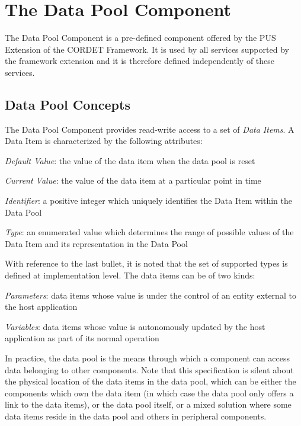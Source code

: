\documentclass[a4paper,10pt]{article}
\let\stdsection\section
\renewcommand\section{\newpage\stdsection}
\newenvironment{fw_itemize}						%
{\begin{itemize}
  \setlength{\itemsep}{1mm}
  \setlength{\parskip}{0pt}
  \setlength{\parsep}{0pt}}
{\end{itemize}}
\begin{document}
\section{The Data Pool Component}\label{sec:dp}
The Data Pool Component is a pre-defined component offered by the PUS Extension of the CORDET Framework. It is used by all services supported by the framework extension and it is therefore defined independently of these services.

\subsection{Data Pool Concepts}\label{sec:dpConcepts}
The Data Pool Component provides read-write access to a set of \textit{Data Items}. A Data Item is characterized by the following attributes: 

\begin{fw_itemize}
\item \textit{Default Value}: the value of the data item when the data pool is reset
\item \textit{Current Value}: the value of the data item at a particular point in time
\item \textit{Identifier}: a positive integer which uniquely identifies the Data Item within the Data Pool
\item \textit{Type}: an enumerated value which determines the range of possible values of the Data Item and its representation in the Data Pool
\end{fw_itemize}

With reference to the last bullet, it is noted that the set of supported types is defined at implementation level. The data items can be of two kinds:

\begin{fw_itemize}
\item \textit{Parameters}: data items whose value is under the control of an entity external to the host application 
\item \textit{Variables}: data items whose value is autonomously updated by the host application as part of its normal operation
\end{fw_itemize}

In practice, the data pool is the means through which a component can access data belonging to other components. Note that this specification is silent about the physical location of the data items in the data pool, which can be either the components which own the data item (in which case the data pool only offers a link to the data items), or the data pool itself, or a mixed solution where some data items reside in the data pool and others in peripheral components. 
\end{document}
